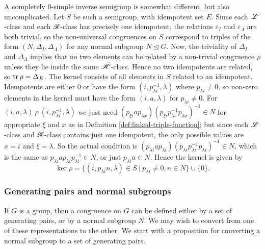 A completely 0-simple inverse semigroup is somewhat different, but also
uncomplicated.  Let $S$ be such a semigroup, with idempotent set $E$.  Since
each $\mathrel{\mathscr{L}}$-class and each $\mathrel{\mathscr{R}}$-class has precisely one idempotent, the
relations $\varepsilon_I$ and $\varepsilon_\Lambda$ are both trivial, so the
non-universal congruences on $S$ correspond to triples of the form
$(N, \Delta_I, \Delta_\Lambda)$ for any normal subgroup $N \trianglelefteq G$.
Now, the triviality of $\Delta_I$ and $\Delta_\Lambda$ implies that no two
elements can be related by a non-trivial congruence $\rho$ unless they lie
inside the same $\mathrel{\mathscr{H}}$-class.  Hence no two idempotents are related, so
$\operatorname{tr} \rho = \Delta_E$.  The kernel consists of all elements in $S$ related to an
idempotent.  Idempotents are either $0$ or have the form
$(i, p_{\lambda i}^{-1}, \lambda)$ where $p_{\lambda i} \neq 0$, so non-zero
elements in the kernel must have the form $(i, a, \lambda)$ for
$p_{\lambda i} \neq 0$.  For
$(i, a, \lambda) ~\rho~ (i, p_{\lambda i}^{-1}, \lambda)$ we just need
$(p_{\xi i} a p_{\lambda x}) (p_{\xi i} p_{\lambda i}^{-1} p_{\lambda x})^{-1}
\in N$
for appropriate $\xi$ and $x$ as in Definition \ref{def:linked-triple-function};
but since each $\mathrel{\mathscr{L}}$-class and $\mathrel{\mathscr{R}}$-class contains just one idempotent, the
only possible values are $x=i$ and $\xi=\lambda$.  So the actual condition is
$(p_{\lambda i} a p_{\lambda i}) (p_{\lambda i} p_{\lambda i}^{-1} p_{\lambda
  i})^{-1} \in N$,
which is the same as $p_{\lambda i} a p_{\lambda i} p_{\lambda i}^{-1} \in N$,
or just $p_{\lambda i} a \in N$.  Hence the kernel is given by
$$\ker \rho =
\{(i, p_{\lambda i}n, \lambda) \in S ~|~ p_{\lambda i} \neq 0, n \in N\}
\cup \{0\}.$$

\subsubsection{Generating pairs and normal subgroups}
If $G$ is a group, then a congruence on $G$ can be defined either by a set of
generating pairs, or by a normal subgroup $N$.  We may wish to convert from one
of these representations to the other.  We start with a proposition for
converting a normal subgroup to a set of generating pairs.

